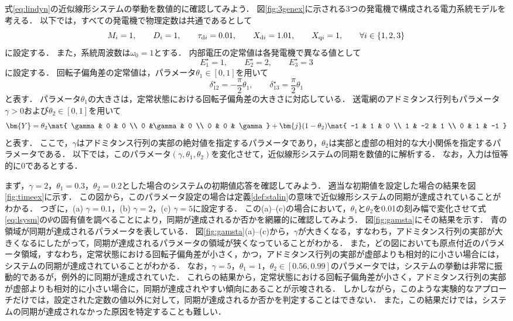 \documentclass[a4j,10pt,oneside,openany,dvipdfmx]{jsbook}
\begin{document}
\begin{example}[近似線形システムの同期に関する数値実験]\label{ex:linsyssim}
式\eqref{eq:lindyn}の近似線形システムの挙動を数値的に確認してみよう．
図\ref{fig:3genex}に示される3つの発電機で構成される電力系統モデルを考える．
以下では，すべての発電機で物理定数は共通であるとして
\[
M_i=1
,\qquad
D_i=1
,\qquad
\tau_{{\rm d}i} = 0.01
,\qquad
X_{{\rm d}i} = 1.01
,\qquad
X_{{\rm q}i} = 1
,\qquad
\forall i \in \{1,2,3\}
\]
に設定する．
また，系統周波数は$\omega_0=1$とする．
内部電圧の定常値は各発電機で異なる値として
\[
E^{\star}_1=1
,\qquad
E^{\star}_2=2
,\qquad
E^{\star}_3=3
\]
に設定する．
回転子偏角差の定常値は，パラメータ$\theta_1 \in [0, 1]$を用いて
\[
\delta_{12}^{\star}= - \frac{\pi}{2} \theta_1
,\qquad
\delta_{13}^{\star}=  \frac{\pi}{2} \theta_1
\]
と表す．
パラメータ$\theta_1$の大きさは，定常状態における回転子偏角差の大きさに対応している．
送電網のアドミタンス行列もパラメータ$\gamma >0$および$\theta_2 \in [0,1]$を用いて
\[
\bm{Y} =
\theta_2
\mat{
\gamma & 0 & 0 \\
0 &\gamma & 0 \\
0 & 0 & \gamma
}
 +
\bm{j} (1-\theta_2) 
\mat{
-1 & 1 & 0 \\
1 & -2 & 1 \\
0 & 1 & -1 
}
\]
と表す．
ここで，$\gamma$はアドミタンス行列の実部の絶対値を指定するパラメータであり，$\theta_2$は実部と虚部の相対的な大小関係を指定するパラメータである．
以下では，このパラメータ$(\gamma,\theta_1,\theta_2)$を変化させて，近似線形システムの同期を数値的に解析する．
なお，入力は恒等的に0であるとする．

まず，$\gamma=2$，$\theta_1=0.3$，$\theta_2=0.2$とした場合のシステムの初期値応答を確認してみよう．
適当な初期値を設定した場合の結果を図\ref{fig:timeex}に示す．
この図から，このパラメータ設定の場合は定義\ref{def:stalin}の意味で近似線形システムの同期が達成されていることがわかる．
つぎに，(a) $\gamma=0.1$，(b) $\gamma=2$，(c) $\gamma=5$に設定する．
この(a)--(c)の場合において，$\theta_1$と$\theta_2$を0.01の刻み幅で変化させて式\eqref{eq:lsysm}の$\Psi$の固有値を調べることにより，同期が達成されるか否かを網羅的に確認してみよう．
図\ref{fig:gamsta}にその結果を示す．
青の領域が同期が達成されるパラメータを表している．
図\ref{fig:gamsta}(a)--(c)から，$\gamma$が大きくなる，すなわち，アドミタンス行列の実部が大きくなるにしたがって，同期が達成されるパラメータの領域が狭くなっていることがわかる．
また，どの図においても原点付近のパラメータ領域，すなわち，定常状態における回転子偏角差が小さく，かつ，アドミタンス行列の実部が虚部よりも相対的に小さい場合には，システムの同期が達成されていることがわかる．
なお，$\gamma=5$，$\theta_1=1$，$\theta_2 \in [0.56,0.99]$のパラメータでは，システムの挙動は非常に振動的であるが，例外的に同期が達成されていた．
これらの結果から，定常状態における回転子偏角差が小さく，アドミタンス行列の実部が虚部よりも相対的に小さい場合に，同期が達成されやすい傾向にあることが示唆される．
しかしながら，このような実験的なアプローチだけでは，設定された定数の値以外に対して，同期が達成されるか否かを判定することはできない．
また，この結果だけでは，システムの同期が達成されなかった原因を特定することも難しい．
\end{example}
\end{document}
